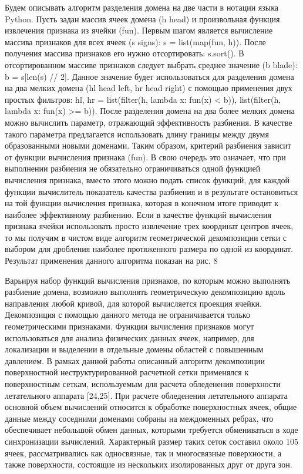 \documentclass[
11pt,%
tightenlines,%
twoside,%
onecolumn,%
nofloats,%
nobibnotes,%
nofootinbib,%
superscriptaddress,%
noshowpacs,%
centertags]%
{revtex4}
\begin{document}
Будем описывать алгоритм разделения домена на две части в нотации языка Python. Пусть задан массив ячеек домена (h  head) и произвольная функция извлечения признака из ячейки (fun). Первым шагом является вычисление массива признаков для всех ячеек (s  signs): s = list(map(fun, h)). После получения массива признаков его нужно отсортировать: s.sort(). В отсортированном массиве признаков следует выбрать среднее значение (b  blade): b = s[len(s) // 2]. Данное значение будет использоваться для разделения домена на два мелких домена (hl  head left, hr  head right) с помощью применения двух простых фильтров: hl, hr = list(filter(h, lambda x: fun(x) < b)), list(filter(h, lambda x: fun(x) >= b)).
После разделения домена на два более мелких домена можно вычислить параметр, отражающий эффективность разбиения. В качестве такого параметра предлагается использовать длину границы между двумя образованными новыми доменами. Таким образом, критерий разбиения зависит от функции вычисления признака (fun). В свою очередь это означает, что при выполнении разбиения не обязательно ограничиваться одной функцией вычисления признака, вместо этого можно подать список функций, для каждой функции вычислитель показатель качества разбиения и в результате остановиться на той функции вычисления признака, которая в конечном итоге приводит к наиболее эффективному разбиению. Если в качестве функций вычисления признака ячейки использовать просто извлечение трех координат центров ячеек, то мы получим в чистом виде алгоритм геометрической декомпозиции сетки с выбором для дробления наиболее протяженного размера по одной из координат. Результат применения данного алгоритма показан на рис. 8

Варьируя набор функций вычисления признаков, по которым можно выполнять разбиение домена, возможно выполнять геометрическую декомпозицию вдоль направления любой кривой, для которой вычисляется проекция ячейки. Декомпозиция с помощью данного метода не ограничивается только геометрическими признаками. Функции вычисления признаков могут использоваться для анализа физических данных ячеек, например, для локализации и выделении в отдельные домены областей с повышенным давлением.
В рамках данной работы описанный алгоритм декомпозиции поверхностной неструктурированной расчетной сетки применялся к поверхностным сеткам, используемым для расчета обледенения поверхности летательного аппарата [24,25]. При расчете обледенения летательного аппарата основной объем вычислений относится к обработке поверхностных ячеек, общие данные между соседними доменами собраны на междоменных ребрах, что обеспечивает небольшой обмен данных, которыми требуется обмениваться в ходе синхронизации вычислений.  Характерный размер таких сеток составил около 105 ячеек, рассматривались как односвязные, так и многосвязные поверхности, а также поверхности, состоящие из нескольких изолированных друг от друга зон.
\end{document}
